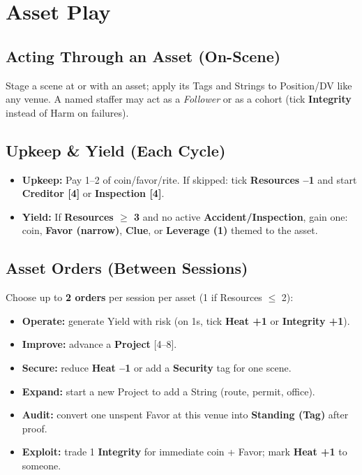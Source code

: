 \documentclass[10pt]{article}
\begin{document}
    \section{Asset Play}
    \subsection{Acting Through an Asset (On-Scene)}
    Stage a scene at or with an asset; apply its Tags and Strings to Position/DV like any venue. A named staffer may act as a \emph{Follower} or as a cohort (tick \textbf{Integrity} instead of Harm on failures).
    
    \subsection{Upkeep \& Yield (Each Cycle)}
    \begin{itemize}
      \item \textbf{Upkeep:} Pay 1--2 of coin/favor/rite. If skipped: tick \textbf{Resources --1} and start \textbf{Creditor [4]} or \textbf{Inspection [4]}.
      \item \textbf{Yield:} If \textbf{Resources $\geq$ 3} and no active \textbf{Accident/Inspection}, gain one: coin, \textbf{Favor (narrow)}, \textbf{Clue}, or \textbf{Leverage (1)} themed to the asset.
    \end{itemize}
    
    \subsection{Asset Orders (Between Sessions)}
    Choose up to \textbf{2 orders} per session per asset (1 if Resources $\leq$ 2):
    \begin{itemize}
      \item \textbf{Operate:} generate Yield with risk (on 1s, tick \textbf{Heat +1} or \textbf{Integrity +1}).
      \item \textbf{Improve:} advance a \textbf{Project} [4--8].
      \item \textbf{Secure:} reduce \textbf{Heat --1} or add a \textbf{Security} tag for one scene.
      \item \textbf{Expand:} start a new Project to add a String (route, permit, office).
      \item \textbf{Audit:} convert one unspent Favor at this venue into \textbf{Standing (Tag)} after proof.
      \item \textbf{Exploit:} trade 1 \textbf{Integrity} for immediate coin + Favor; mark \textbf{Heat +1} to someone.
    \end{itemize}
\end{document}
